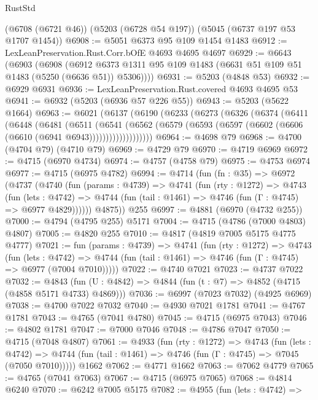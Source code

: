 \begin{lexlean}{RustStd}
\begin{coremodule}
    (@6708 (@6721 @46))
    (@5203 (@6728 @54 @197))
    (@5045 (@6737 @197 @53 @1707 @1454))
@6908 := @5051 @6373 @95 @109 @1454 @1483
@6912 := LexLeanPreservation.Rust.Corr.bOfE @4693 @4695 @4697
@6929 := @6643
    (@6903
      (@6908
        (@6912 @6373 @1311 @95 @109 @1483 (@6631 @51 @109 @51 @1483 (@5250 (@6636 @51)) @5306))))
@6931 := @5203 (@4848 @53)
@6932 := @6929 @6931
@6936 := LexLeanPreservation.Rust.covered @4693 @4695 @53
@6941 := @6932 (@5203 (@6936 @57 @226 @55))
@6943 := @5203 (@5622 @1664)
@6963 := @6021
    (@6137
      (@6190
        (@6233
          (@6273
            (@6326
              (@6374
                (@6411
                  (@6448
                    (@6481
                      (@6511
                        (@6541
                          (@6562
                            (@6579
                              (@6593 (@6597 (@6602 (@6606 (@6610 (@6941 @6943)))))))))))))))))))
@6964 := @4698 @79
@6968 := @4700 (@4704 @79) (@4710 @79)
@6969 := @4729 @79
@6970 := @4719 @6969
@6972 := @4715 (@6970 @4734)
@6974 := @4757 (@4758 @79)
@6975 := @4753 @6974
@6977 := @4715 (@6975 @4782)
@6994 := @4714
    (fun (fn : @35) =>
    @6972
      (@4737
        (@4740
          (fun (params : @4739) =>
          @4741
            (fun (rty : @1272) =>
            @4743
              (fun (lets : @4742) =>
              @4744 (fun (tail : @1461) => @4746 (fun (Γ : @4745) => @6977 @4829))))))
        @4875))
    @255
@6997 := @4881 (@6970 (@4732 @255))
@7000 := @4794 (@4795 @255) @5171
@7004 := @4715 (@4786 (@7000 @4803) @4807)
@7005 := @4820 @255
@7010 := @4817 (@4819 @7005 @5175 @4775 @4777)
@7021 := fun (params : @4739) =>
  @4741
    (fun (rty : @1272) =>
    @4743
      (fun (lets : @4742) =>
      @4744 (fun (tail : @1461) => @4746 (fun (Γ : @4745) => @6977 (@7004 @7010)))))
@7022 := @4740 @7021
@7023 := @4737 @7022
@7032 := @4843 (fun (U : @4842) => @4844 (fun (t : @7) => @4852 (@4715 (@4858 @5171 @4733) @4869)))
@7036 := @6997 (@7023 @7032) (@4925 @6969)
@7038 := @4700 @7022 @7032
@7040 := @4930 @7021 @1781
@7041 := @4767 @1781
@7043 := @4765 (@7041 @4780)
@7045 := @4715 (@6975 @7043)
@7046 := @4802 @1781
@7047 := @7000 @7046
@7048 := @4786 @7047
@7050 := @4715 (@7048 @4807)
@7061 := @4933
    (fun (rty : @1272) =>
    @4743
      (fun (lets : @4742) =>
      @4744 (fun (tail : @1461) => @4746 (fun (Γ : @4745) => @7045 (@7050 @7010)))))
    @1662
@7062 := @4771 @1662
@7063 := @7062 @4779
@7065 := @4765 (@7041 @7063)
@7067 := @4715 (@6975 @7065)
@7068 := @4814 @6240
@7070 := @6242 @7005 @5175
@7082 := @4955
    (fun (lets : @4742) =>

\end{coremodule}
\end{lexlean}
